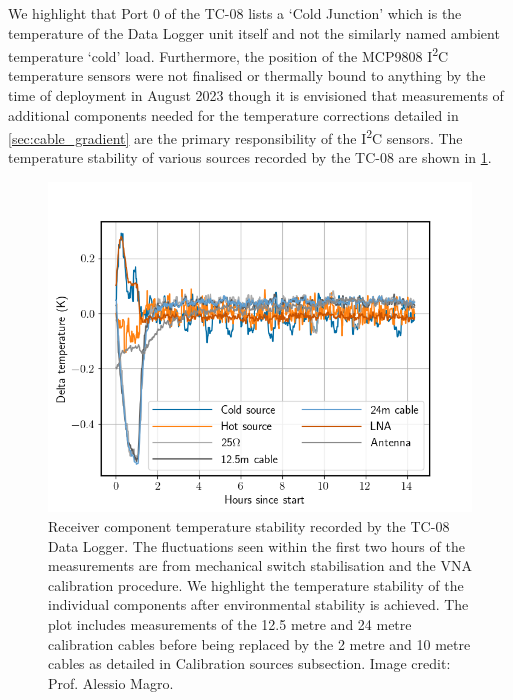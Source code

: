 We highlight that Port 0 of the TC-08 lists a ‘Cold Junction’ which is the temperature of the Data Logger unit itself and not the similarly named ambient temperature ‘cold’ load. Furthermore, the position of the MCP9808 I\textsuperscript{2}C temperature sensors were not finalised or thermally bound to anything by the time of deployment in August 2023 though it is envisioned that measurements of additional components needed for the temperature corrections detailed in \cref{sec:cable_gradient} are the primary responsibility of the I\textsuperscript{2}C sensors. The temperature stability of various sources recorded by the TC-08 are shown in \cref{fig:temperature}.
\begin{figure}
    \centering
    \includegraphics[scale=0.6]{temperature}
    \caption{Receiver component temperature stability recorded by the TC-08 Data Logger. The fluctuations seen within the first two hours of the measurements are from mechanical switch stabilisation and the VNA calibration procedure. We highlight the temperature stability of the individual components after environmental stability is achieved. The plot includes measurements of the 12.5 metre and 24 metre calibration cables before being replaced by the 2 metre and 10 metre cables as detailed in Calibration sources subsection. Image credit: Prof. Alessio Magro.}
    \label{fig:temperature}
\end{figure}


